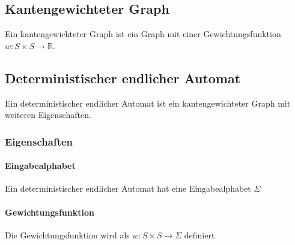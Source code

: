 \documentclass[../main.tex]{subfiles}
\begin{document}
        \subsection{Kantengewichteter Graph}
            Ein kantengewichteter Graph ist ein Graph mit einer Gewichtungsfunktion $w\colon S \times S \rightarrow \mathbb{R}$.
            
            \begin{center}
            \end{center}
            
        \subsection[DEA]{Deterministischer endlicher Automat}
        \label{section:DiskreteMathematik:FormaleGrundlagen:DEA}
            Ein deterministischer endlicher Automat ist ein kantengewichteter Graph mit weiteren Eigenschaften.
            
            \subsubsection{Eigenschaften}
                \paragraph{Eingabealphabet}
                    Ein deterministischer endlicher Automat hat eine Eingabealphabet $\Sigma$
                
                \paragraph{Gewichtungsfunktion}
                    Die Gewichtungsfunktion wird als $w\colon S \times S \rightarrow \Sigma$ definiert.
                    
\end{document}
